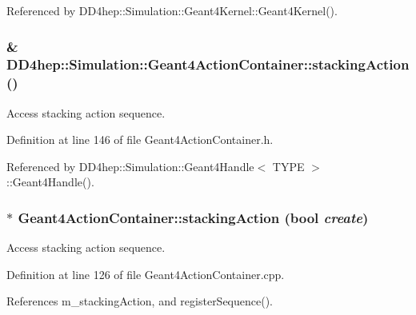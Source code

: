 Referenced by DD4hep::Simulation::Geant4Kernel::Geant4Kernel().\hypertarget{class_d_d4hep_1_1_simulation_1_1_geant4_action_container_a688c893718ea08ea0c7fe7432506915b}{
\subsubsection[{stackingAction}]{\& DD4hep::Simulation::Geant4ActionContainer::stackingAction ()}}
\label{class_d_d4hep_1_1_simulation_1_1_geant4_action_container_a688c893718ea08ea0c7fe7432506915b}


Access stacking action sequence. 

Definition at line 146 of file Geant4ActionContainer.h.

Referenced by DD4hep::Simulation::Geant4Handle$<$ TYPE $>$::Geant4Handle().\hypertarget{class_d_d4hep_1_1_simulation_1_1_geant4_action_container_ad9a53bd3401686eeeb711ef467b2a800}{
\subsubsection[{stackingAction}]{ $\ast$ Geant4ActionContainer::stackingAction (bool {\em create})}}
\label{class_d_d4hep_1_1_simulation_1_1_geant4_action_container_ad9a53bd3401686eeeb711ef467b2a800}


Access stacking action sequence. 

Definition at line 126 of file Geant4ActionContainer.cpp.

References m\_\-stackingAction, and registerSequence().

